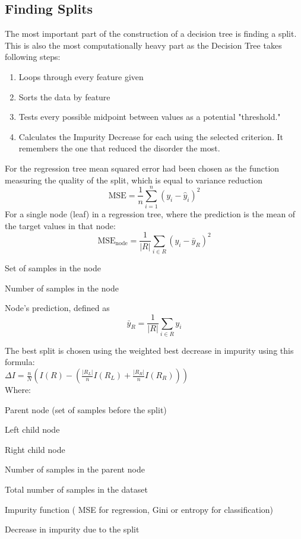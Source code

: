 \subsection{Finding Splits}
The most important part of the construction of a decision tree is finding a split. This is also the most computationally heavy part as the Decision Tree takes following steps:
\begin{enumerate}
\setlength{\parskip}{0pt}

    \item[1.] Loops through every feature given
    \item[2.] Sorts the data by feature
    \item[3.] Tests every possible midpoint between values as a potential "threshold."
    \item[4.] Calculates the Impurity Decrease for each using the selected criterion. It remembers the one that reduced the disorder the most.
\end{enumerate}
For the regression tree mean squared error had been chosen as the function measuring the quality of the split, which is equal to variance reduction 
$$
\mathrm{MSE} = \frac{1}{n} \sum_{i=1}^{n} \left(y_i - \hat{y}_i\right)^2
$$
For a single node (leaf) in a regression tree, where the prediction is the mean of the target values in that node:
$$
\mathrm{MSE}_{\text{node}} = \frac{1}{|R|} \sum_{i \in R} \left(y_i - \bar{y}_R\right)^2
$$
\begin{description}
\setlength{\itemsep}{0pt}
\setlength{\parskip}{0pt}
  \item[$R$] Set of samples in the node
  \item[$|R|$] Number of samples in the node
  \item[$\bar{y}_R$] Node's prediction, defined as
  \[
    \bar{y}_R = \frac{1}{|R|} \sum_{i \in R} y_i
  \]
\end{description}

The best split is chosen using the weighted best decrease in impurity using this formula:\\
$\Delta I = \frac{n}{N} \left( I(R) - \left( \frac{|R_L|}{n} I(R_L) + \frac{|R_R|}{n} I(R_R) \right) \right)
\quad$\\
Where:
\begin{description}
\setlength{\itemsep}{0pt}
\setlength{\parskip}{0pt}
  \item[$R$] Parent node (set of samples before the split)
  \item[$R_L$] Left child node
  \item[$R_R$] Right child node
  \item[$n = |R|$] Number of samples in the parent node
  \item[$N$] Total number of samples in the dataset
  \item[$I(\cdot)$] Impurity function ( MSE for regression, Gini or entropy for classification)
  \item[$\Delta I$] Decrease in impurity due to the split
\end{description}



